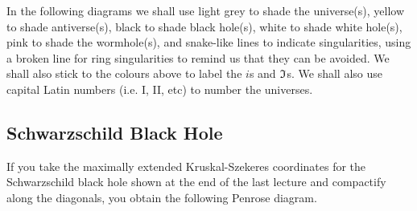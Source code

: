 In the following diagrams we shall use light grey to shade the universe(s), yellow to shade antiverse(s), black to shade black hole(s), white to shade white hole(s), pink to shade the wormhole(s), and snake-like lines to indicate singularities, using a broken line for ring singularities to remind us that they can be avoided. We shall also stick to the colours above to label the $i$s and $\mathfrak{I}$s. We shall also use capital Latin numbers (i.e. I, II, etc) to number the universes.

\subsection{Schwarzschild Black Hole}

If you take the maximally extended Kruskal-Szekeres coordinates for the Schwarzschild black hole shown at the end of the last lecture and compactify along the diagonals, you obtain the following Penrose diagram. 

